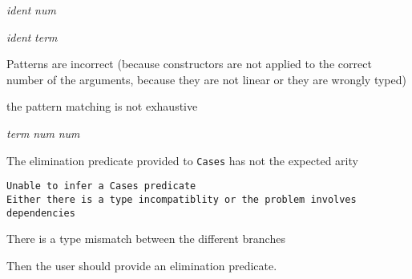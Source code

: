 \begin{ErrMsgs}
\item {} {\sl
    ident}  {\sl num} 
  
  {\sl ident}  {\sl term}
  
  {\term}
  {\term} 

 Patterns are incorrect (because constructors are not applied to
  the correct number of the arguments, because they are not linear or
  they are wrongly typed)

\item {}

the pattern matching is not exhaustive

\item {} {\sl term}  {\sl num}  {\sl
    num} 

The elimination predicate provided to \texttt{Cases} has not the
  expected arity



 
  
\item {\tt Unable to infer a Cases predicate\\
    Either there is a type incompatiblity or the problem involves\\
    dependencies}
 
  There is a type mismatch between the different branches

  Then the user should provide an elimination predicate.


\end{ErrMsgs}
